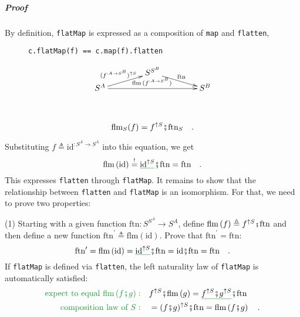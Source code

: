 \subparagraph{Proof}

By definition, \lstinline!flatMap! is expressed as a composition
of \lstinline!map! and \lstinline!flatten!,

\begin{wrapfigure}{l}{0.4\columnwidth}%
\vspace{-0.85\baselineskip}

\begin{lstlisting}
c.flatMap(f) == c.map(f).flatten
\end{lstlisting}
\vspace{0.2\baselineskip}
\[
\xymatrix{\xyScaleY{0.3pc}\xyScaleX{3.5pc} & S^{S^{B}}\ar[rd]\sp(0.5){\ \text{ftn}\ }\\
S^{A}\ar[ru]\sp(0.5){(f^{:A\rightarrow S^{B}})^{\uparrow S}\ }\ar[rr]\sp(0.5){\text{flm}\,(f^{:A\rightarrow S^{B}})\,} &  & S^{B}
}
\]

\vspace{1.3\baselineskip}
\end{wrapfigure}%

~\vspace{-1.5\baselineskip}

\[
\text{flm}_{S}(f)=f^{\uparrow S}\bef\text{ftn}_{S}\quad.
\]

\noindent Substituting $f\triangleq\text{id}^{:S^{A}\rightarrow S^{A}}$
into this equation, we get
\[
\text{flm}\left(\text{id}\right)\overset{!}{=}\gunderline{\text{id}^{\uparrow S}}\bef\text{ftn}=\text{ftn}\quad.
\]
This expresses \lstinline!flatten! through \lstinline!flatMap!.
It remains to show that the relationship between \lstinline!flatten!
and \lstinline!flatMap! is an isomorphism. For that, we need to prove
two properties:

(1) Starting with a given function $\text{ftn}:S^{S^{A}}\rightarrow S^{A}$,
define $\text{flm}\left(f\right)\triangleq f^{\uparrow S}\bef\text{ftn}$
and then define a new function $\text{ftn}^{\prime}\triangleq\text{flm}\left(\text{id}\right)$.
Prove that $\text{ftn}^{\prime}=\text{ftn}$:
\[
\text{ftn}^{\prime}=\text{flm}\left(\text{id}\right)=\gunderline{\text{id}^{\uparrow S}}\bef\text{ftn}=\text{id}\bef\text{ftn}=\text{ftn}\quad.
\]
If \lstinline!flatMap! is defined via \lstinline!flatten!, the left
naturality law of \lstinline!flatMap! is automatically satisfied:
\begin{align*}
{\color{greenunder}\text{expect to equal }\text{flm}\left(f\bef g\right):}\quad & f^{\uparrow S}\bef\text{flm}\left(g\right)=\gunderline{f^{\uparrow S}\bef g^{\uparrow S}}\bef\text{ftn}\\
{\color{greenunder}\text{composition law of }S:}\quad & =(f\bef g)^{\uparrow S}\bef\text{ftn}=\text{flm}\left(f\bef g\right)\quad.
\end{align*}

